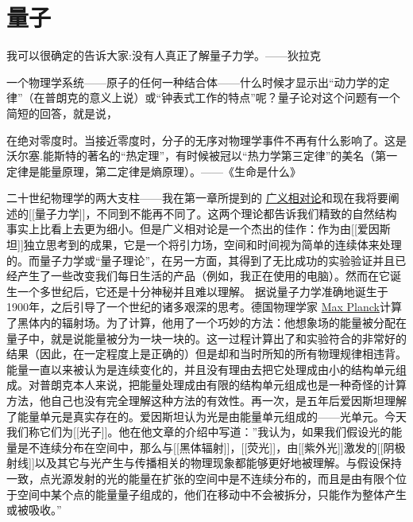 	\chapter{量子}
\indent

我可以很确定的告诉大家:没有人真正了解量子力学。——狄拉克

一个物理学系统——原子的任何一种结合体——什么时候才显示出“动力学的定律”（在普朗克的意义上说）或“钟表式工作的特点”呢？量子论对这个问题有一个简短的回答，就是说，

在绝对零度时。当接近零度时，分子的无序对物理学事件不再有什么影响了。这是沃尔塞.能斯特的著名的“热定理”，有时候被冠以“热力学第三定律”的美名（第一定律是能量原理，第二定律是熵原理）。——《生命是什么》


    二十世纪物理学的两大支柱——我在第一章所提到的
\href{http://toyhouse.cc/wiki/index.php/广义相对论}{广义相对论}和现在我将要阐述的[[量子力学]]，不同到不能再不同了。这两个理论都告诉我们精致的自然结构事实上比看上去更为细小。但是广义相对论是一个杰出的佳作：作为由[[爱因斯坦]]独立思考到的成果，它是一个将引力场，空间和时间视为简单的连续体来处理的。而量子力学或“量子理论”，在另一方面，其得到了无比成功的实验验证并且已经产生了一些改变我们每日生活的产品（例如，我正在使用的电脑）。然而在它诞生一个多世纪后，它还是十分神秘并且难以理解。
    据说量子力学准确地诞生于1900年，之后引导了一个世纪的诸多艰深的思考。德国物理学家
\href{https://en.wikipedia.org/wiki/马克思·普朗克}{Max Planck}计算了黑体内的辐射场。为了计算，他用了一个巧妙的方法：他想象场的能量被分配在量子中，就是说能量被分为一块一块的。这一过程计算出了和实验符合的非常好的结果（因此，在一定程度上是正确的）但是却和当时所知的所有物理规律相违背。能量一直以来被认为是连续变化的，并且没有理由去把它处理成由小的结构单元组成。对普朗克本人来说，把能量处理成由有限的结构单元组成也是一种奇怪的计算方法，他自己也没有完全理解这种方法的有效性。再一次，是五年后爱因斯坦理解了能量单元是真实存在的。爱因斯坦认为光是由能量单元组成的——光单元。今天我们称它们为[[光子]]。他在他文章的介绍中写道：''我认为，如果我们假设光的能量是不连续分布在空间中，那么与[[黑体辐射]]，[[荧光]]，由[[紫外光]]激发的[[阴极射线]]以及其它与光产生与传播相关的物理现象都能够更好地被理解。与假设保持一致，点光源发射的光的能量在扩张的空间中是不连续分布的，而且是由有限个位于空间中某个点的能量量子组成的，他们在移动中不会被拆分，只能作为整体产生或被吸收。''


